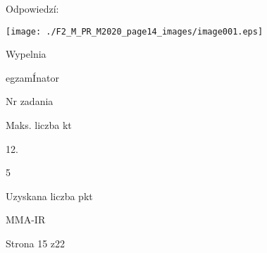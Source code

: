 \documentclass[a4paper,12pt]{article}
\begin{document}
Odpowiedzí:
\begin{center}
\texttt{[image: ./F2\_M\_PR\_M2020\_page14\_images/image001.eps]}
\end{center}
Wypelnia

egzamÍnator

Nr zadania

Maks. liczba kt

12.

5

Uzyskana liczba pkt

MMA-IR

Strona 15 z22
\end{document}
